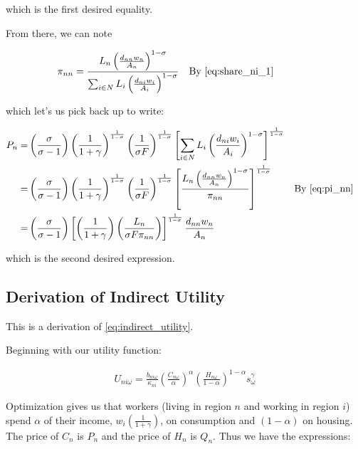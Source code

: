 \documentclass[10pt]{article}
\begin{document}
which is the first desired equality. 

From there, we can note

\begin{align}
    \pi_{nn} &= \frac{L_n \left(\frac{d_{nn} w_n}{A_n}\right)^{1-\sigma}}{\sum_{i \in N} L_i \left(\frac{d_{ni} w_i}{A_i}\right)^{1-\sigma}} && \parbox[t]{4cm}{\raggedright By \eqref{eq:share_ni_1}} \label{eq:pi_nn}
\end{align}

which let's us pick back up to write:

\begin{align}
    P_n = &\left(\frac{\sigma}{\sigma-1}\right) \left(\frac{1}{1 + \gamma}\right)^{\frac{1}{1 - \sigma}} \left(\frac{1}{\sigma F}\right)^{\frac{1}{1-\sigma}} \left[\sum_{i \in N} L_i \left(\frac{d_{ni} w_i}{A_i}\right)^{1-\sigma}\right]^{\frac{1}{1-\sigma}} \\
    = &\left(\frac{\sigma}{\sigma-1}\right) \left(\frac{1}{1 + \gamma}\right)^{\frac{1}{1 - \sigma}} \left(\frac{1}{\sigma F}\right)^{\frac{1}{1-\sigma}} \left[\frac{L_n \left(\frac{d_{nn} w_n}{A_n}\right)^{1-\sigma}}{\pi_{nn}}\right]^{\frac{1}{1-\sigma}} && \text{By \eqref{eq:pi_nn}} \\
    = &\left(\frac{\sigma}{\sigma-1}\right) \left[\left(\frac{1}{1 + \gamma}\right) \left(\frac{L_n}{\sigma F \pi_{nn}}\right)\right]^{\frac{1}{1-\sigma}} \frac{d_{nn} w_n}{A_n}
\end{align}

which is the second desired expression.

\subsection{Derivation of Indirect Utility}
\label{sec:indirect_utility}

This is a derivation of \eqref{eq:indirect_utility}.

Beginning with our utility function:

\begin{align}
    U_{n i \omega}=\frac{b_{n i \omega}}{\kappa_{n i}}\left(\frac{C_{n \omega}}{\alpha}\right)^\alpha\left(\frac{H_{n \omega}}{1-\alpha}\right)^{1-\alpha} s_\omega^\gamma
\end{align}

Optimization gives us that workers (living in region $n$ and working in 
region $i$) spend $\alpha$
of their income, $w_i \left(\frac{1}{1+\gamma}\right)$, on consumption and $(1-\alpha)$ on housing.
The price of $C_n$ is $P_n$ and the price of $H_n$ is $Q_n$.
Thus we have the expressions:
\end{document}
